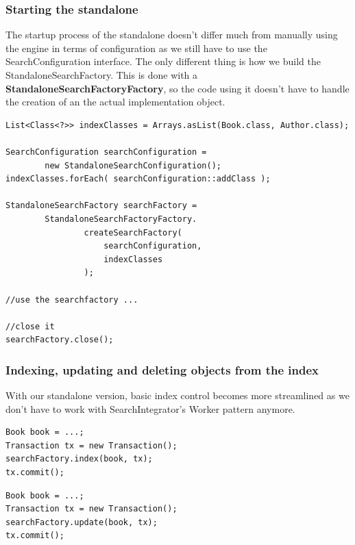 \subsubsection{Starting the standalone}

The startup process of the standalone doesn't differ much from manually using the engine in terms of configuration as we still have to use the SearchConfiguration interface. The only different thing is how we build the StandaloneSearchFactory. This is done with a \textbf{StandaloneSearchFactoryFactory}, so the code using it doesn't have to handle the creation of an the actual implementation object.
\\
\lstset{language=java}
\begin{lstlisting}[frame=htrbl, caption={Starting up the standalone}, label={lst:using_standalone.java}]
List<Class<?>> indexClasses = Arrays.asList(Book.class, Author.class);

SearchConfiguration searchConfiguration = 
		new StandaloneSearchConfiguration();
indexClasses.forEach( searchConfiguration::addClass );

StandaloneSearchFactory searchFactory = 
		StandaloneSearchFactoryFactory.
				createSearchFactory(
					searchConfiguration,
					indexClasses
				);
				
//use the searchfactory ...

//close it
searchFactory.close();
\end{lstlisting}

\subsubsection{Indexing, updating and deleting objects from the index}

With our standalone version, basic index control becomes more streamlined as we don't have to work with  SearchIntegrator's Worker pattern anymore.
\\
\lstset{language=java}
\begin{lstlisting}[frame=htrbl, caption={Indexing an object with the standalone}, label={lst:indexing_object_native.java}]
Book book = ...;
Transaction tx = new Transaction();
searchFactory.index(book, tx);
tx.commit();
\end{lstlisting}

\lstset{language=java}
\begin{lstlisting}[frame=htrbl, caption={Updating an object with the standalone}, label={lst:updating_object_native.java}]
Book book = ...;
Transaction tx = new Transaction();
searchFactory.update(book, tx);
tx.commit();
\end{lstlisting}

